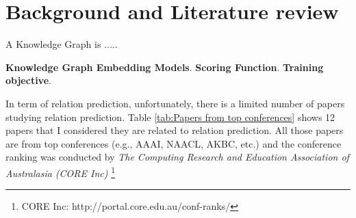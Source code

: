 
\chapter{Background and Literature review}




A Knowledge Graph is .....

\noindent\textbf{Knowledge Graph Embedding Models}. 
\newline
\noindent\textbf{Scoring Function}.
\newline
\noindent\textbf{Training objective}.


\noindent In term of relation prediction, unfortunately, there is a limited number of papers studying relation prediction. Table \ref{tab:Papers from top conferences} shows 12 papers that I considered they are related to relation prediction. All those papers are from top conferences (e.g., AAAI, NAACL, AKBC, etc.) and the conference ranking was conducted by \textit{The Computing Research and Education Association of Australasia (CORE Inc)} \footnote{CORE Inc: http://portal.core.edu.au/conf-ranks/}

